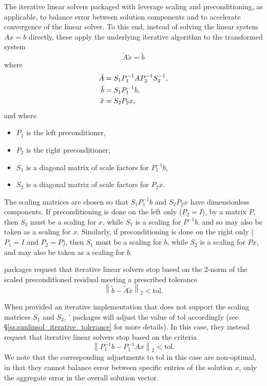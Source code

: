 The iterative linear solvers packaged with {\sundials} leverage
scaling and preconditioning, as applicable, to balance error between
solution components and to accelerate convergence of the linear
solver.  To this end, instead of solving the  linear system $Ax = b$
directly, these apply the underlying iterative algorithm to the
transformed system
\begin{equation}
  \label{eq:transformed_linear_system}
  \tilde{A} \tilde{x} = \tilde{b}
\end{equation}
where
\begin{align}
  \notag
  \tilde{A} &= S_1 P_1^{-1} A P_2^{-1} S_2^{-1},\\
  \label{eq:transformed_linear_system_components}
  \tilde{b} &= S_1 P_1^{-1} b,\\
  \notag
  \tilde{x} &= S_2 P_2 x,
\end{align}
and where
\begin{itemize}
\item $P_1$ is the left preconditioner,
\item $P_2$ is the right preconditioner,
\item $S_1$ is a diagonal matrix of scale factors for $P_1^{-1} b$,
\item $S_2$ is a diagonal matrix of scale factors for $P_2 x$.
\end{itemize}
The scaling matrices are chosen so that $S_1 P_1^{-1} b$ and $S_2 P_2 x$
have dimensionless components. If preconditioning is done on the left only
($P_2 = I$), by a  matrix $P$, then $S_2$ must be a scaling for $x$, while $S_1$
is a scaling for $P^{-1} b$, and so may also be taken as a scaling for $x$.
Similarly, if preconditioning is done on the right only ($P_1 = I$ and
$P_2 = P$), then $S_1$ must be a scaling for $b$, while $S_2$ is a scaling for
$P x$, and may also be taken as a scaling for $b$.

{\sundials} packages request that iterative linear solvers stop
based on the 2-norm of the scaled preconditioned residual meeting a
prescribed tolerance
\[
  \left\| \tilde{b} - \tilde{A} \tilde{x} \right\|_2  <  \text{tol}.
\]

When provided an iterative {\sunlinsol} implementation that does not
support the scaling matrices $S_1$ and $S_2$, {\sundials}'
packages will adjust the value of $\text{tol}$ accordingly
(see \S\ref{ss:sunlinsol_iterative_tolerance} for more details). In
this case, they instead request that iterative linear solvers stop
based on the criteria
\[
   \left\| P_1^{-1} b - P_1^{-1} A x \right\|_2  <  \text{tol}.
\]
We note that the corresponding adjustments to $\text{tol}$ in
this case are non-optimal, in that they cannot balance error between
specific entries of the solution $x$, only the aggregate error
in the overall solution vector.

